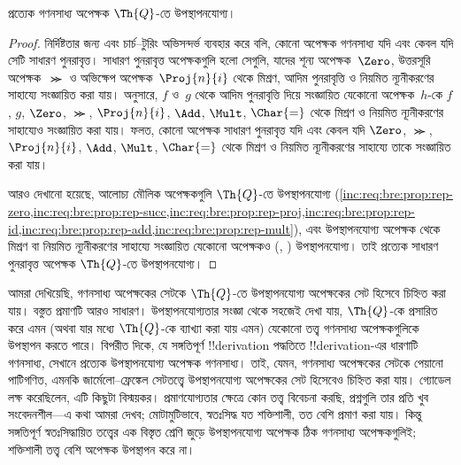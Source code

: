 \documentclass[../../../include/open-logic-section]{subfiles}
\begin{document}

\begin{thm}
প্রত্যেক গণনসাধ্য অপেক্ষক $\Th{Q}$-তে উপস্থাপনযোগ্য।
\end{thm}

\begin{proof}
নির্দিষ্টতার জন্য এবং চার্চ--টুরিং অভিসন্দর্ভ ব্যবহার করে বলি, কোনো অপেক্ষক
গণনসাধ্য যদি এবং কেবল যদি সেটি সাধারণ পুনরাবৃত্ত। সাধারণ পুনরাবৃত্ত
অপেক্ষকগুলি হলো সেগুলি, যাদের শূন্য অপেক্ষক~$\Zero$, উত্তরসূরি
অপেক্ষক~$\Succ$ ও অভিক্ষেপ অপেক্ষক~$\Proj{n}{i}$ থেকে মিশ্রণ, আদিম
পুনরাবৃত্তি ও নিয়মিত ন্যূনীকরণের সাহায্যে সংজ্ঞায়িত করা যায়।
 অনুসারে, $f$ ও~$g$ থেকে আদিম পুনরাবৃত্তি দিয়ে
সংজ্ঞায়িত যেকোনো অপেক্ষক~$h$-কে $f$, $g$, $\Zero$, $\Succ$,
$\Proj{n}{i}$, $\Add$, $\Mult$, $\Char{=}$ থেকে মিশ্রণ ও নিয়মিত
ন্যূনীকরণের সাহায্যেও সংজ্ঞায়িত করা যায়। ফলত, কোনো অপেক্ষক সাধারণ
পুনরাবৃত্ত যদি এবং কেবল যদি $\Zero$, $\Succ$, $\Proj{n}{i}$, $\Add$,
$\Mult$, $\Char{=}$ থেকে মিশ্রণ ও নিয়মিত ন্যূনীকরণের সাহায্যে তাকে
সংজ্ঞায়িত করা যায়।

আরও দেখানো হয়েছে, আলোচ্য মৌলিক অপেক্ষকগুলি $\Th{Q}$-তে উপস্থাপনযোগ্য
(\cref{inc:req:bre:prop:rep-zero,inc:req:bre:prop:rep-succ,inc:req:bre:prop:rep-proj,inc:req:bre:prop:rep-id,inc:req:bre:prop:rep-add,inc:req:bre:prop:rep-mult}),
এবং উপস্থাপনযোগ্য অপেক্ষক থেকে মিশ্রণ বা নিয়মিত ন্যূনীকরণের সাহায্যে
সংজ্ঞায়িত যেকোনো অপেক্ষকও
(,
) উপস্থাপনযোগ্য। তাই প্রত্যেক সাধারণ
পুনরাবৃত্ত অপেক্ষক $\Th{Q}$-তে উপস্থাপনযোগ্য।
\end{proof}

\begin{explain}
আমরা দেখিয়েছি, গণনসাধ্য অপেক্ষকের সেটকে $\Th{Q}$-তে উপস্থাপনযোগ্য অপেক্ষকের
সেট হিসেবে চিহ্নিত করা যায়। বস্তুত প্রমাণটি আরও সাধারণ। উপস্থাপনযোগ্যতার
সংজ্ঞা থেকে সহজেই দেখা যায়, $\Th{Q}$-কে প্রসারিত করে এমন (অথবা যার মধ্যে
$\Th{Q}$-কে ব্যাখ্যা করা যায় এমন) যেকোনো তত্ত্ব গণনসাধ্য অপেক্ষকগুলিকে
উপস্থাপন করতে পারে। বিপরীত দিকে, যে সঙ্গতিপূর্ণ !!{derivation} পদ্ধতিতে
!!{derivation}-এর ধারণাটি গণনসাধ্য, সেখানে প্রত্যেক উপস্থাপনযোগ্য অপেক্ষক
গণনসাধ্য। তাই, যেমন, গণনসাধ্য অপেক্ষকের সেটকে পেয়ানো পাটিগণিত, এমনকি
জার্মেলো--ফ্রেঙ্কেল সেটতত্ত্বে উপস্থাপনযোগ্য অপেক্ষকের সেট হিসেবেও চিহ্নিত
করা যায়। গ্যোডেল লক্ষ করেছিলেন, এটি কিছুটা বিস্ময়কর। প্রমাণযোগ্যতার ক্ষেত্রে
কোন তত্ত্ব বিবেচনা করছি, প্রশ্নগুলি তার প্রতি খুব সংবেদনশীল—এ কথা আমরা দেখব;
মোটামুটিভাবে, স্বতঃসিদ্ধ যত শক্তিশালী, তত বেশি প্রমাণ করা যায়। কিন্তু
সঙ্গতিপূর্ণ স্বতঃসিদ্ধায়িত তত্ত্বের এক বিস্তৃত শ্রেণি জুড়ে উপস্থাপনযোগ্য
অপেক্ষক ঠিক গণনসাধ্য অপেক্ষকগুলিই; শক্তিশালী তত্ত্ব বেশি অপেক্ষক উপস্থাপন
করে না।
\end{explain}
\end{document}
